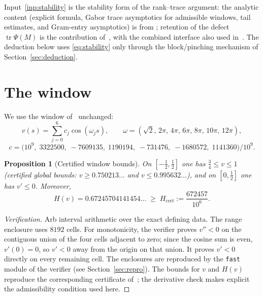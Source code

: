 \documentclass[11pt]{article}
\newtheorem{proposition}[theorem]{Proposition}
\DeclareMathOperator{\tr}{tr}
\begin{document}
Input~\ref{inp:stability} is the stability form of the rank--trace argument:
the analytic content (explicit formula, Gabor trace asymptotics for
admissible windows, tail estimates, and Gram-entry asymptotics) is from
\cite{Claude26}; retention of the defect $\tr\Psi(M)$ is the contribution
of~\cite{Ainta26}, with the combined interface also used in~\cite{Trmdy26}.
The deduction below uses \eqref{eq:stability} only through the block/pinching
mechanism of Section~\ref{sec:deduction}.

\section{The window}\label{sec:window}

We use the window of~\cite{Trmdy26} unchanged:
\begin{equation}\label{eq:window}
 v(s)=\sum_{j=0}^{6}c_j\cos(\omega_j s),\qquad
 \omega=(\sqrt2,\,2\pi,\,4\pi,\,6\pi,\,8\pi,\,10\pi,\,12\pi),
\end{equation}
\[
 c=\bigl(10^9,\;3322500,\;-7609135,\;1190194,\;-731476,\;-1680572,\;1141360\bigr)/10^9 .
\]

\begin{proposition}[Certified window bounds]\label{prop:window}
On $[-\tfrac12,\tfrac12]$ one has $\tfrac34\le v\le1$
(certified global bounds: $v\ge0.750213\ldots$ and
$v\le0.995632\ldots$), and
on $[0,\tfrac12]$ one has $v'\le0$.  Moreover,
\[
 H(v)=0.67245704141454\ldots\;\ge\;H_{\mathrm{cert}}:=\frac{672457}{10^6}.
\]
\end{proposition}

\begin{proof}[Verification]
Arb interval arithmetic over the exact defining data.  The range enclosure
uses $8192$ cells.  For monotonicity, the verifier proves $v''<0$ on the
contiguous union of the four cells adjacent to zero; since the cosine sum is
even, $v'(0)=0$, so $v'<0$ away from the origin on that union.  It proves
$v'<0$ directly on every remaining cell.  The enclosures are reproduced by
the \texttt{fast} module of the verifier (see Section~\ref{sec:repro}).
The bounds for $v$ and $H(v)$ reproduce the corresponding certificate
of~\cite{Trmdy26}; the derivative check makes explicit the admissibility
condition used here.
\end{proof}
\end{document}
